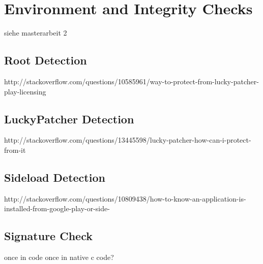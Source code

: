 \section{Environment and Integrity Checks}\label{section:tampering}
siehe masterarbeit 2

\subsection{Root Detection}\label{subsection:tampering-root}
http://stackoverflow.com/questions/10585961/way-to-protect-from-lucky-patcher-play-licensing
\subsection{LuckyPatcher Detection}\label{subsection:tampering-luckypatcher}
http://stackoverflow.com/questions/13445598/lucky-patcher-how-can-i-protect-from-it
\subsection{Sideload Detection}\label{subsection:tampering-sideload}
http://stackoverflow.com/questions/10809438/how-to-know-an-application-is-installed-from-google-play-or-side-
\subsection{Signature Check}\label{subsection:tampering-signature}
once in code \newline
once in native c code?
